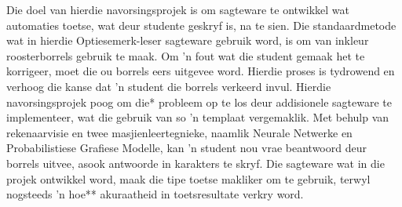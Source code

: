 
\begin{uittreksel}    %
Die doel van hierdie navorsingsprojek is om sagteware te ontwikkel wat automaties toetse, wat deur studente geskryf is, na te sien. Die standaardmetode wat in hierdie Optiesemerk-leser sagteware gebruik word, is om van inkleur roosterborrels gebruik te maak. Om 'n fout wat die student gemaak het te korrigeer, moet die ou borrels eers uitgevee word. Hierdie proses is tydrowend en verhoog die kanse dat 'n student die borrels verkeerd invul. Hierdie navorsingsprojek poog om die* probleem op te los deur addisionele sagteware te implementeer, wat die gebruik van so 'n templaat vergemaklik. Met behulp van rekenaarvisie en twee masjienleertegnieke, naamlik Neurale Netwerke en Probabilistiese Grafiese Modelle, kan 'n student nou vrae beantwoord deur borrels uitvee, asook antwoorde in karakters te skryf.  Die sagteware wat in die projek ontwikkel word, maak die tipe toetse makliker om te gebruik, terwyl nogsteeds 'n hoe** akuraatheid in toetsresultate verkry word.
\end{uittreksel}